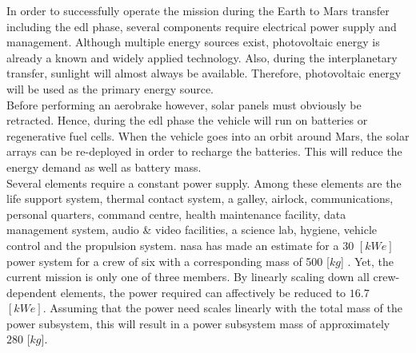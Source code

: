 In order to successfully operate the mission during the Earth to Mars transfer including the \gls{edl} phase, several components require electrical power supply and management. Although multiple  energy sources exist, photovoltaic energy is already a known and widely applied technology. Also, during the interplanetary transfer, sunlight will almost always be available. Therefore, photovoltaic energy will be used as the primary energy source.\\
 
Before performing an aerobrake however, solar panels must obviously be retracted. Hence, during the \gls{edl} phase the vehicle will run on batteries or regenerative fuel cells. When the vehicle goes into an orbit around Mars, the solar arrays can be re-deployed in order to recharge the batteries. This will reduce the energy demand as well as battery mass.\\

Several elements require a constant power supply. Among these elements are the life support system, thermal contact system, a galley, airlock, communications, personal quarters, command centre, health maintenance facility, data management system, audio \& video facilities, a science lab, hygiene, vehicle control and the propulsion system. \gls{nasa} has made an estimate for a $30$ $[kWe]$ power system for a crew of six with a corresponding mass of 500 [$kg$] \cite{Hoffman1997a}. Yet, the current mission is only one of three members. By linearly scaling down all crew-dependent elements, the power required can affectively be reduced to $16.7$ $[kWe]$. Assuming that the power need scales linearly with the total mass of the power subsystem, this will result in a power subsystem mass of approximately $280$ [$kg$].\\